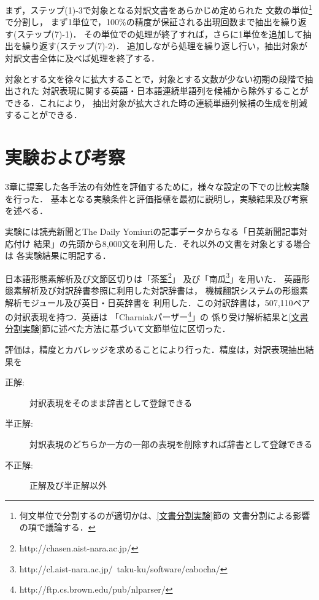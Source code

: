 まず，ステップ(1)-3で対象となる対訳文書をあらかじめ定められた
文数の単位\footnote{何文単位で分割するのが適切かは、\ref{文書分割実験}節の
文書分割による影響の項で議論する．}で分割し，
まず1単位で，100\%の精度が保証される出現回数まで抽出を繰り返す(ステップ(7)-1)．
その単位での処理が終了すれば，さらに1単位を追加して抽出を繰り返す(ステップ(7)-2)．
追加しながら処理を繰り返し行い，抽出対象が対訳文書全体に及べば処理を終了する．

対象とする文を徐々に拡大することで，対象とする文数が少ない初期の段階で抽出された
対訳表現に関する英語・日本語連続単語列を候補から除外することができる．これにより，
抽出対象が拡大された時の連続単語列候補の生成を削減することができる．

\section{実験および考察}
\label{実験}

3章に提案した各手法の有効性を評価するために，様々な設定の下での比較実験を行った．
基本となる実験条件と評価指標を最初に説明し，実験結果及び考察を述べる．

実験には読売新聞とThe Daily Yomiuriの記事データからなる「日英新聞記事対応付け
結果」\cite{内山:2003}の先頭から8,000文を利用した．それ以外の文書を対象とする場合は
各実験結果に明記する．

日本語形態素解析及び文節区切りは「茶筌\footnote{http://chasen.aist-nara.ac.jp/}」
及び「南瓜\footnote{http://cl.aist-nara.ac.jp/~taku-ku/software/cabocha/}」を用いた．
英語形態素解析及び対訳辞書参照に利用した対訳辞書は，
機械翻訳システム\cite{Kitamura-Murata:2003}の形態素解析モジュール及び英日・日英辞書を
利用した．この対訳辞書は，507,110ペアの対訳表現を持つ．英語は
「Charniakパーザー\footnote{http://ftp.cs.brown.edu/pub/nlparser/}」の
係り受け解析結果と\ref{文書分割実験}節に述べた方法に基づいて文節単位に区切った．

評価は，精度とカバレッジを求めることにより行った．精度は，対訳表現抽出結果を

\vspace{2mm}

\begin{description}
\item[正解:] 対訳表現をそのまま辞書として登録できる
\item[半正解:] 対訳表現のどちらか一方の一部の表現を削除すれば辞書として登録できる
\item[不正解:] 正解及び半正解以外
\end{description}

